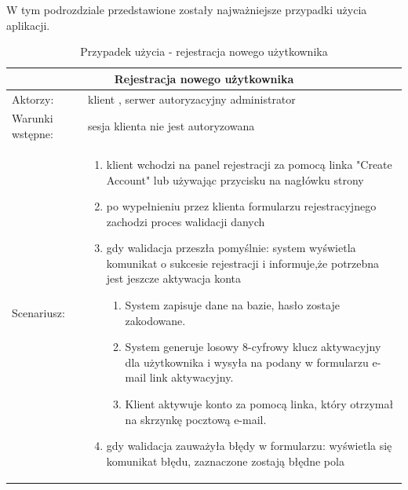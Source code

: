 W tym podrozdziale przedstawione zostały najważniejsze przypadki użycia aplikacji.


\begin{table}[h!]

\begin{tabular}{ |p{2cm}||p{13cm}|  }
	
	\hline
	\multicolumn{2}{|c|}{Rejestracja nowego użytkownika} \\
	\hline
	Aktorzy: &klient , serwer autoryzacyjny administrator\\
	\hline
	Warunki wstępne: & sesja klienta nie jest autoryzowana\\ 
	\hline
	Scenariusz: &
	\begin{enumerate}[leftmargin=0em]
		\item klient wchodzi na panel rejestracji za pomocą linka "Create Account" lub używając przycisku na nagłówku strony 
		
		\item po wypełnieniu przez klienta formularzu rejestracyjnego zachodzi proces walidacji danych

		\item  gdy walidacja przeszła pomyślnie: system wyświetla komunikat o sukcesie rejestracji i informuje,że potrzebna jest jeszcze aktywacja konta

	\begin{enumerate}[leftmargin=2em]
	 	\item  System zapisuje dane na bazie, hasło zostaje zakodowane.
	 		
	 		\item  System generuje losowy 8-cyfrowy klucz aktywacyjny dla użytkownika i wysyła na podany w formularzu e-mail link aktywacyjny.
	 		
	 		\item Klient  aktywuje konto za pomocą linka, który otrzymał na skrzynkę pocztową e-mail.
	\end{enumerate}
		
		\item  gdy walidacja zauważyła błędy w formularzu: wyświetla się komunikat błędu, zaznaczone zostają błędne pola
			\end{enumerate}
\\
	\hline

\end{tabular}

	\caption{Przypadek użycia - rejestracja nowego użytkownika}
\end{table}

